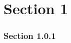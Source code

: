 \documentclass{article}
\begin{document}
\section{Section 1}
\subsubsection{Section 1.0.1}
\end{document}
